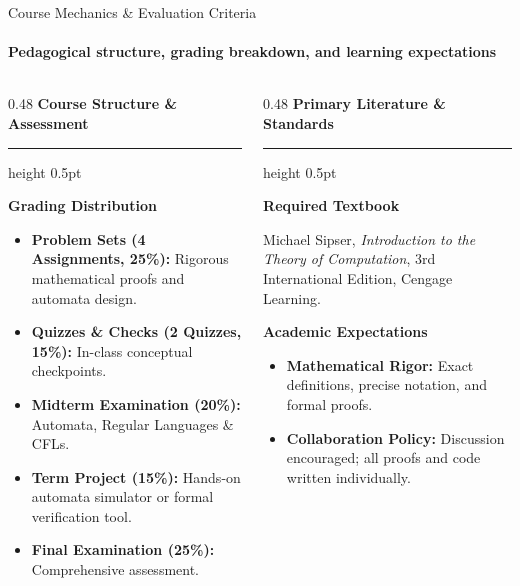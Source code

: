 \documentclass[aspectratio=169, 10pt]{beamer}
\newcommand{\colheader}[1]{%
  {\noindent\footnotesize\bfseries\color{gimpanavy}#1}%
  \vspace{0.02cm}%
  {\color{gimpanavy!30}\hrule height 0.5pt}%
  \vspace{0.05cm}%
}
\newcommand{\cardtitle}[1]{{\noindent\footnotesize\bfseries\color{gimpanavy}#1}\par\vspace{0.03cm}}
\begin{document}
\begin{frame}{Course Mechanics \& Evaluation Criteria}
  \framesubtitle{Pedagogical structure, grading breakdown, and learning expectations}
  
  \begin{columns}[T]
    \begin{column}{0.48\textwidth}
      \colheader{Course Structure \& Assessment}
      \begin{tcolorbox}[conceptcard]
        \cardtitle{Grading Distribution}
        \begin{itemize}\setlength{\itemsep}{2pt}\scriptsize
          \item \textbf{Problem Sets (4 Assignments, 25\%):} Rigorous mathematical proofs and automata design.
          \item \textbf{Quizzes \& Checks (2 Quizzes, 15\%):} In-class conceptual checkpoints.
          \item \textbf{Midterm Examination (20\%):} Automata, Regular Languages \& CFLs.
          \item \textbf{Term Project (15\%):} Hands-on automata simulator or formal verification tool.
          \item \textbf{Final Examination (25\%):} Comprehensive assessment.
        \end{itemize}
      \end{tcolorbox}
    \end{column}
    
    \begin{column}{0.48\textwidth}
      \colheader{Primary Literature \& Standards}
      \begin{tcolorbox}[conceptcard]
        \cardtitle{Required Textbook}
        {\scriptsize
        Michael Sipser, \textit{Introduction to the Theory of Computation}, 3rd International Edition, Cengage Learning.
        }
        \vspace{0.06cm}
        
        \cardtitle{Academic Expectations}
        \begin{itemize}\setlength{\itemsep}{2pt}\scriptsize
          \item \textbf{Mathematical Rigor:} Exact definitions, precise notation, and formal proofs.
          \item \textbf{Collaboration Policy:} Discussion encouraged; all proofs and code written individually.
        \end{itemize}
      \end{tcolorbox}
    \end{column}
  \end{columns}
  

\end{frame}
\end{document}
